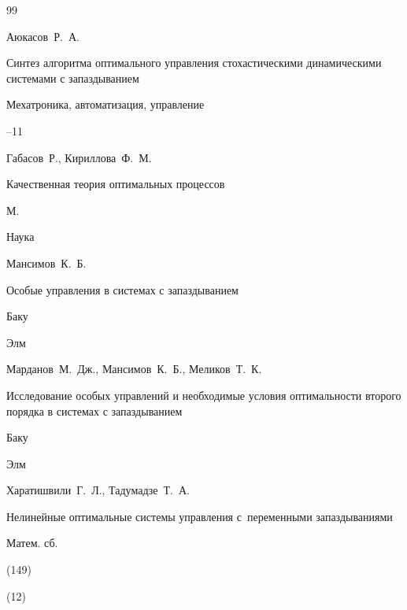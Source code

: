 \begin{thebibliography}{99}

\by Аюкасов~Р.~А.

\paper Синтез алгоритма оптимального управления стохастическими динамическими системами с запаздыванием

\jour Мехатроника, автоматизация, управление



–11





\by Габасов~Р., Кириллова~Ф.~М.

\book Качественная теория оптимальных процессов

\publaddr М.

\publ  Наука






\by  Мансимов~К.~Б.

\book Особые управления в системах с запаздыванием

\publaddr Баку

\publ Элм






\by Марданов~М.~Дж., Мансимов~К.~Б., Меликов~Т.~К.

\book Исследование особых управлений и необходимые условия оптимальности второго порядка в системах с запаздыванием

\publaddr Баку

\publ Элм






\by Харатишвили~Г.~Л., Тадумадзе~Т.~А. 

\paper Нелинейные оптимальные системы управления с~переменными запаздываниями

\jour Матем. сб.


(149)

(12)


\end{thebibliography}
